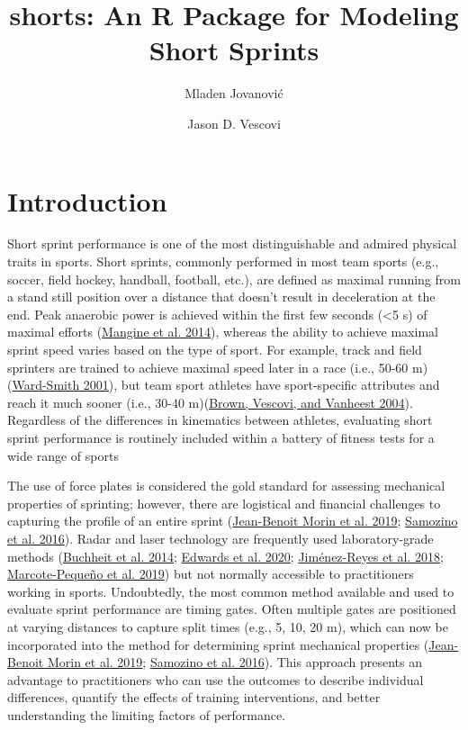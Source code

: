 \documentclass[fleqn,10pt]{wlpeerj} %
\title{shorts: An R Package for Modeling Short Sprints}
\author[1]{Mladen Jovanović}
\author[2]{Jason D. Vescovi}
\affil[1]{Faculty of Sport and Physical Education, University of Belgrade, Serbia}
\affil[2]{Faculty of Kinesiology and Physical Education, Graduate School of Exercise Science, Toronto, ON Canada}
\begin{document}
\flushbottom
\maketitle
\thispagestyle{empty}

\hypertarget{introduction}{%
\section{Introduction}\label{introduction}}

Short sprint performance is one of the most distinguishable and admired physical traits in sports. Short sprints, commonly performed in most team sports (e.g., soccer, field hockey, handball, football, etc.), are defined as maximal running from a stand still position over a distance that doesn't result in deceleration at the end. Peak anaerobic power is achieved within the first few seconds (\textless5 s) of maximal efforts (\protect\hyperlink{ref-mangineSpeedForcePower2014}{Mangine et al. 2014}), whereas the ability to achieve maximal sprint speed varies based on the type of sport. For example, track and field sprinters are trained to achieve maximal speed later in a race (i.e., 50-60 m) (\protect\hyperlink{ref-ward-smithEnergyConversionStrategies2001}{Ward-Smith 2001}), but team sport athletes have sport-specific attributes and reach it much sooner (i.e., 30-40 m)(\protect\hyperlink{ref-brownAssessmentLinearSprinting2004}{Brown, Vescovi, and Vanheest 2004}). Regardless of the differences in kinematics between athletes, evaluating short sprint performance is routinely included within a battery of fitness tests for a wide range of sports

The use of force plates is considered the gold standard for assessing mechanical properties of sprinting; however, there are logistical and financial challenges to capturing the profile of an entire sprint (\protect\hyperlink{ref-morinSimpleMethodComputing2019}{Jean-Benoit Morin et al. 2019}; \protect\hyperlink{ref-samozinoSimpleMethodMeasuring2016}{Samozino et al. 2016}). Radar and laser technology are frequently used laboratory-grade methods (\protect\hyperlink{ref-buchheitMechanicalDeterminantsAcceleration2014}{Buchheit et al. 2014}; \protect\hyperlink{ref-edwardsSprintAccelerationCharacteristics2020}{Edwards et al. 2020}; \protect\hyperlink{ref-jimenez-reyesRelationshipVerticalHorizontal2018}{Jiménez-Reyes et al. 2018}; \protect\hyperlink{ref-marcote-pequenoAssociationForceVelocity2019}{Marcote-Pequeño et al. 2019}) but not normally accessible to practitioners working in sports. Undoubtedly, the most common method available and used to evaluate sprint performance are timing gates. Often multiple gates are positioned at varying distances to capture split times (e.g., 5, 10, 20 m), which can now be incorporated into the method for determining sprint mechanical properties (\protect\hyperlink{ref-morinSimpleMethodComputing2019}{Jean-Benoit Morin et al. 2019}; \protect\hyperlink{ref-samozinoSimpleMethodMeasuring2016}{Samozino et al. 2016}). This approach presents an advantage to practitioners who can use the outcomes to describe individual differences, quantify the effects of training interventions, and better understanding the limiting factors of performance.
\end{document}
